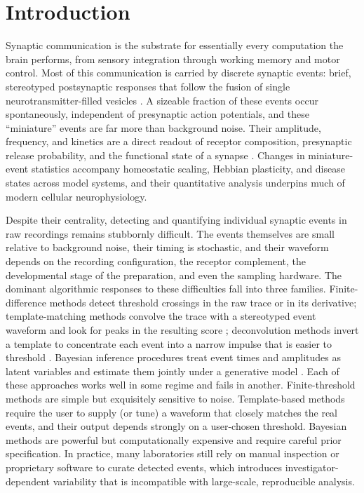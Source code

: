 
\section{Introduction}

Synaptic communication is the substrate for essentially every computation the brain performs, from sensory integration through working memory and motor control. Most of this communication is carried by discrete synaptic events: brief, stereotyped postsynaptic responses that follow the fusion of single neurotransmitter-filled vesicles \citep{kaeser2014release}. A sizeable fraction of these events occur spontaneously, independent of presynaptic action potentials, and these ``miniature'' events are far more than background noise. Their amplitude, frequency, and kinetics are a direct readout of receptor composition, presynaptic release probability, and the functional state of a synapse \citep{kavalali2015mechanisms, huganir2013ampars, reese2015spontaneous}. Changes in miniature-event statistics accompany homeostatic scaling, Hebbian plasticity, and disease states across model systems, and their quantitative analysis underpins much of modern cellular neurophysiology.

Despite their centrality, detecting and quantifying individual synaptic events in raw recordings remains stubbornly difficult. The events themselves are small relative to background noise, their timing is stochastic, and their waveform depends on the recording configuration, the receptor complement, the developmental stage of the preparation, and even the sampling hardware. The dominant algorithmic responses to these difficulties fall into three families. Finite-difference methods detect threshold crossings in the raw trace or in its derivative; template-matching methods convolve the trace with a stereotyped event waveform and look for peaks in the resulting score \citep{clements1997detection}; deconvolution methods invert a template to concentrate each event into a narrow impulse that is easier to threshold \citep{pernia2012deconvolution}. Bayesian inference procedures treat event times and amplitudes as latent variables and estimate them jointly under a generative model \citep{merel2016bayesian}. Each of these approaches works well in some regime and fails in another. Finite-threshold methods are simple but exquisitely sensitive to noise. Template-based methods require the user to supply (or tune) a waveform that closely matches the real events, and their output depends strongly on a user-chosen threshold. Bayesian methods are powerful but computationally expensive and require careful prior specification. In practice, many laboratories still rely on manual inspection or proprietary software \citep{mori2024simplyfire} to curate detected events, which introduces investigator-dependent variability that is incompatible with large-scale, reproducible analysis.

